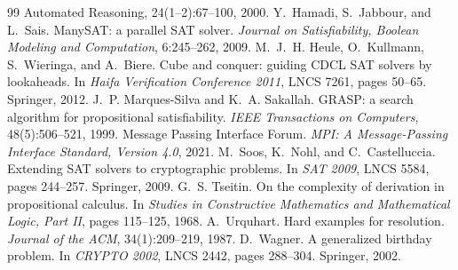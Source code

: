 \documentclass[11pt,a4paper]{article}
\begin{document}
\begin{thebibliography}{99}
{  Automated Reasoning}, 24(1--2):67--100, 2000.
 Y.~Hamadi, S.~Jabbour, and L.~Sais. ManySAT: a parallel SAT
  solver. \emph{Journal on Satisfiability, Boolean Modeling and Computation}, 6:245--262,
  2009.
 M.~J.~H. Heule, O.~Kullmann, S.~Wieringa, and A.~Biere. Cube and
  conquer: guiding CDCL SAT solvers by lookaheads. In \emph{Haifa Verification Conference
  2011}, LNCS 7261, pages 50--65. Springer, 2012.
 J.~P. Marques-Silva and K.~A. Sakallah. GRASP: a search
  algorithm for propositional satisfiability. \emph{IEEE Transactions on Computers},
  48(5):506--521, 1999.
 Message Passing Interface Forum. \emph{MPI: A Message-Passing Interface
  Standard, Version 4.0}, 2021.
 M.~Soos, K.~Nohl, and C.~Castelluccia. Extending SAT solvers to
  cryptographic problems. In \emph{SAT 2009}, LNCS 5584, pages 244--257. Springer, 2009.
 G.~S. Tseitin. On the complexity of derivation in propositional
  calculus. In \emph{Studies in Constructive Mathematics and Mathematical Logic, Part II},
  pages 115--125, 1968.
 A.~Urquhart. Hard examples for resolution. \emph{Journal of the
  ACM}, 34(1):209--219, 1987.
 D.~Wagner. A generalized birthday problem. In \emph{CRYPTO
  2002}, LNCS 2442, pages 288--304. Springer, 2002.
\end{thebibliography}
\end{document}
